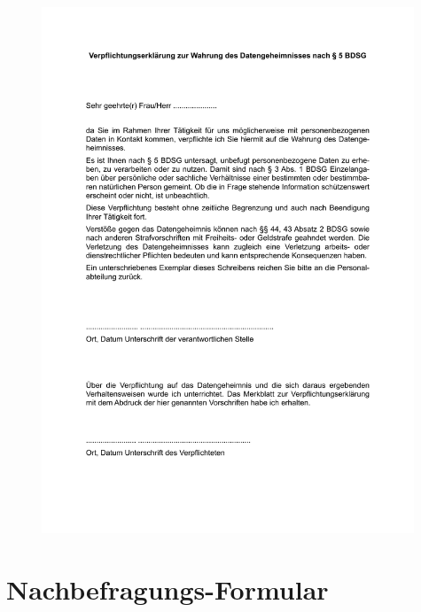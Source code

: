 \begin{figure}
  \vspace{-20pt}
  \begin{center}
    \includegraphics[page=1,width=0.99\textwidth]{./images/datenschutz}
  \end{center}
  \vspace{-40pt}
\end{figure}

\clearpage
\section{Nachbefragungs-Formular}
\label{sec:nachbefragung}



